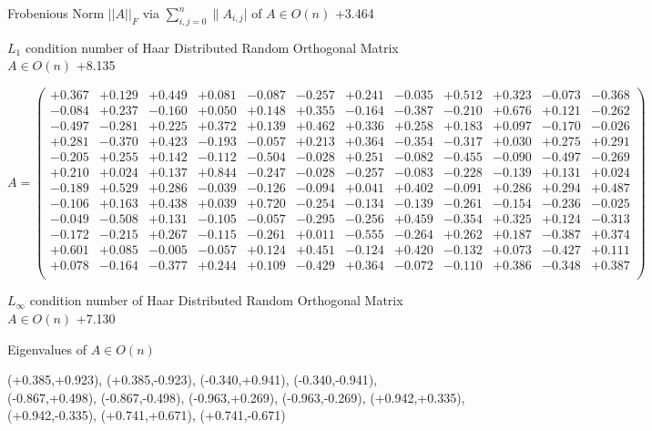 \documentclass[9pt]{article}
\theoremstyle{plain}
\theoremstyle{definition}
\theoremstyle{remark}
\numberwithin{equation}{section}
\begin{document}
Frobenious Norm  $||A||_{\textit{F}}$ via $\sum\limits_{i,j =0}^{n} \|A_{i,j}|$   of  $A \in O(n)$  +3.464

$L_1$ condition number of Haar Distributed Random Orthogonal Matrix $A \in O(n)$ +8.135

$A = \left(
\begin{array}{
cccccccccccc}
+0.367 & +0.129 & +0.449 & +0.081 & -0.087 & -0.257 & +0.241 & -0.035 & +0.512 & +0.323 & -0.073 & -0.368 \\
-0.084 & +0.237 & -0.160 & +0.050 & +0.148 & +0.355 & -0.164 & -0.387 & -0.210 & +0.676 & +0.121 & -0.262 \\
-0.497 & -0.281 & +0.225 & +0.372 & +0.139 & +0.462 & +0.336 & +0.258 & +0.183 & +0.097 & -0.170 & -0.026 \\
+0.281 & -0.370 & +0.423 & -0.193 & -0.057 & +0.213 & +0.364 & -0.354 & -0.317 & +0.030 & +0.275 & +0.291 \\
-0.205 & +0.255 & +0.142 & -0.112 & -0.504 & -0.028 & +0.251 & -0.082 & -0.455 & -0.090 & -0.497 & -0.269 \\
+0.210 & +0.024 & +0.137 & +0.844 & -0.247 & -0.028 & -0.257 & -0.083 & -0.228 & -0.139 & +0.131 & +0.024 \\
-0.189 & +0.529 & +0.286 & -0.039 & -0.126 & -0.094 & +0.041 & +0.402 & -0.091 & +0.286 & +0.294 & +0.487 \\
-0.106 & +0.163 & +0.438 & +0.039 & +0.720 & -0.254 & -0.134 & -0.139 & -0.261 & -0.154 & -0.236 & -0.025 \\
-0.049 & -0.508 & +0.131 & -0.105 & -0.057 & -0.295 & -0.256 & +0.459 & -0.354 & +0.325 & +0.124 & -0.313 \\
-0.172 & -0.215 & +0.267 & -0.115 & -0.261 & +0.011 & -0.555 & -0.264 & +0.262 & +0.187 & -0.387 & +0.374 \\
+0.601 & +0.085 & -0.005 & -0.057 & +0.124 & +0.451 & -0.124 & +0.420 & -0.132 & +0.073 & -0.427 & +0.111 \\
+0.078 & -0.164 & -0.377 & +0.244 & +0.109 & -0.429 & +0.364 & -0.072 & -0.110 & +0.386 & -0.348 & +0.387 \\
\end{array}
\right)$ \newline 

$L_{\infty}$ condition number of Haar Distributed Random Orthogonal Matrix $A \in O(n)$ +7.130

Eigenvalues of $A \in O(n)$

(+0.385,+0.923), (+0.385,-0.923), (-0.340,+0.941), (-0.340,-0.941), (-0.867,+0.498), (-0.867,-0.498), (-0.963,+0.269), (-0.963,-0.269), (+0.942,+0.335), (+0.942,-0.335), (+0.741,+0.671), (+0.741,-0.671)
\end{document}
